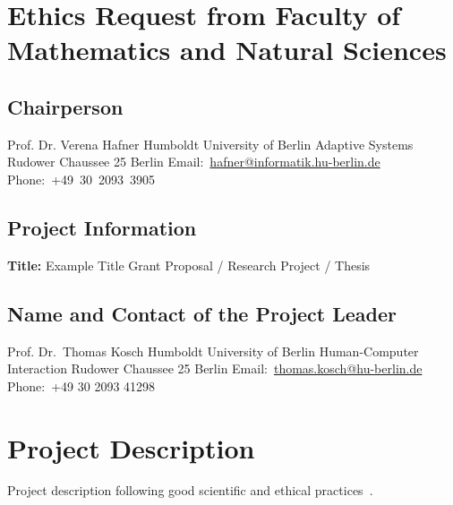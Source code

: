 \documentclass[letterpaper]{article}
\title{}
\author{<YOUR NAME>}
\date{\today}
\newcommand\textstyleHyperlink[1]{\textcolor[rgb]{0.019607844,0.3882353,0.75686276}{#1}}
\begin{document}
\clearpage\clearpage\pagestyle{MP}
\section{Ethics Request from Faculty of Mathematics and Natural Sciences}

\bigskip

\subsection{Chairperson}
Prof. Dr. Verena Hafner\newline
Humboldt University of Berlin\newline
Adaptive Systems\newline
Rudower Chaussee 25 Berlin\newline
Email:\ \href{mailto:hafner@informatik.hu-berlin.de}{\textstyleHyperlink{hafner@informatik.hu-berlin.de}}\newline
Phone:\ +49\ 30\ 2093\ 3905


\bigskip

\subsection{Project Information}
{\bfseries Title:} Example Title \newline
{} Grant Proposal / Research Project / Thesis

\subsection{Name and Contact of the Project Leader}
Prof. Dr.\ Thomas Kosch\newline
Humboldt University of Berlin\newline
Human-Computer Interaction\newline
Rudower Chaussee 25 Berlin\newline
Email:\ \href{mailto:thomas.kosch@hu-berlin.de}{\textstyleHyperlink{thomas.kosch@hu-berlin.de}}\ \newline
\textcolor[rgb]{0.2,0.2,0.2}{Phone:\ }+49 30 2093 41298

\clearpage

\section{Project Description}
Project description following good scientific and ethical practices~\cite{greene2019better}.
\end{document}
